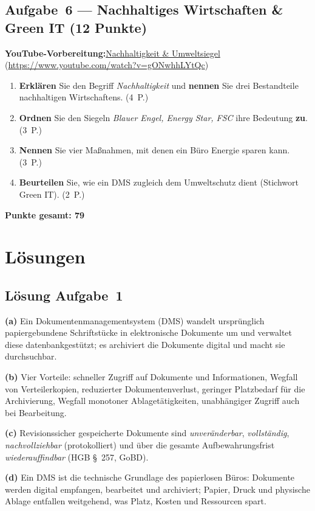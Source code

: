 \documentclass[11pt, a4paper]{article}
\begin{document}
\subsection*{Aufgabe~6 --- Nachhaltiges Wirtschaften \& Green IT (12 Punkte)}

\noindent\textbf{\color{bfwAccent}YouTube-Vorbereitung:}\enspace \href{https://www.youtube.com/watch?v=gONwhhLYtQc}{Nachhaltigkeit \& Umweltsiegel} (\url{https://www.youtube.com/watch?v=gONwhhLYtQc})

\medskip
\begin{enumerate}[label=(\alph*)]
  \item \textbf{Erklären} Sie den Begriff \emph{Nachhaltigkeit} und \textbf{nennen} Sie drei Bestandteile nachhaltigen Wirtschaftens. \hfill (4~P.)
  \item \textbf{Ordnen} Sie den Siegeln \emph{Blauer Engel, Energy Star, FSC} ihre Bedeutung \textbf{zu}. \hfill (3~P.)
  \item \textbf{Nennen} Sie vier Maßnahmen, mit denen ein Büro Energie sparen kann. \hfill (3~P.)
  \item \textbf{Beurteilen} Sie, wie ein DMS zugleich dem Umweltschutz dient (Stichwort Green IT). \hfill (2~P.)
\end{enumerate}

\vspace{1em}
\noindent\textbf{Punkte gesamt: 79}

\newpage

\section{Lösungen}\label{loesungen}

\subsection*{Lösung Aufgabe~1}
\begin{loesung}
\textbf{(a)} Ein Dokumentenmanagementsystem (DMS) wandelt ursprünglich papiergebundene
Schriftstücke in elektronische Dokumente um und verwaltet diese datenbankgestützt; es
archiviert die Dokumente digital und macht sie durchsuchbar.

\textbf{(b)} Vier Vorteile: schneller Zugriff auf Dokumente und Informationen, Wegfall
von Verteilerkopien, reduzierter Dokumentenverlust, geringer Platzbedarf für die
Archivierung, Wegfall monotoner Ablagetätigkeiten, unabhängiger Zugriff auch bei
Bearbeitung.

\textbf{(c)} Revisionssicher gespeicherte Dokumente sind \emph{unveränderbar},
\emph{vollständig}, \emph{nachvollziehbar} (protokolliert) und über die gesamte
Aufbewahrungsfrist \emph{wiederauffindbar} (HGB \S~257, GoBD).

\textbf{(d)} Ein DMS ist die technische Grundlage des papierlosen Büros: Dokumente werden
digital empfangen, bearbeitet und archiviert; Papier, Druck und physische Ablage
entfallen weitgehend, was Platz, Kosten und Ressourcen spart.
\end{loesung}
\end{document}
